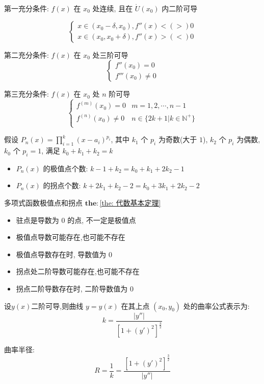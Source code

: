 \begin{theorem}[拐点判别]
	第一充分条件: $f(x)$ 在 $x_{0}$ 处连续, 且在 $\mathring{U}(x_{0})$ 内二阶可导
	
	$$\begin{cases}
		x\in(x_{0}-\delta,x_{0}), f''(x)<(>)0\\
		x\in(x_{0},x_{0}+\delta), f''(x)>(<)0
	\end{cases}$$

	第二充分条件: $f(x)$ 在 $x_{0}$ 处三阶可导
	$$\begin{cases}
		f''(x_{0}) = 0\\
		f'''(x_{0})\neq 0
	\end{cases}$$

	第三充分条件: $f(x)$ 在 $x_{0}$ 处 $n$ 阶可导
	$$\begin{cases}
		f^{(m)}(x_{0}) = 0 & m = 1,2,\cdots,n-1\\
		f^{(n)}(x_{0}) \neq 0 & n\in \{2k+1|k\in \mathbb{N}^{+}\}\\
	\end{cases}$$
	
\end{theorem}
\begin{theorem}[多项式函数极值点和拐点个数]
	假设 $P_{n}(x)=\prod\limits_{i=1}^{k}(x-a_{i})^{p_{i}}$, 
	其中 $k_{1}$ 个 $p_{i}$ 为奇数(大于 $1$), $k_{2}$ 个 $p_{i}$ 为偶数, $k_{0}$ 个 $p_{i}=1$, 满足 $k_{0}+k_{1}+k_{2} = k$
	
	\begin{itemize}
		\item $P_{n}(x)$ 的极值点个数: $k-1+k_{2} = k_{0}+k_{1}+2k_{2}-1$
		\item $P_{n}(x)$ 的拐点个数: $k+2k_{1}+k_{2}-2 = k_{0}+3k_{1}+2k_{2}-2$
	\end{itemize}
	多项式函数极值点和拐点 $\mathbf{the: }$\ref{the: 代数基本定理}
\end{theorem}
\begin{anymark}[注]
	\begin{itemize}
		\item 驻点是导数为 $0$ 的点, 不一定是极值点
		\item 极值点导数可能存在,也可能不存在
		\item 极值点导数存在时, 导数值为 $0$
		\item 拐点处二阶导数可能存在,也可能不存在
		\item 拐点二阶导数存在时, 二阶导数值为 $0$
	\end{itemize}
\end{anymark}
\begin{definition}[曲率和曲率半径]

	设$y(x)$二阶可导,则曲线 $y=y(x)$ 在其上点 $(x_{0},y_{0})$ 处的曲率公式表示为:
	$$k=\frac{|y''|}{[1+(y')^{2}]^{\frac{3}{2}}}$$

	曲率半径:
	$$R=\frac{1}{k}=\frac{[1+(y')^{2}]^{\frac{3}{2}}}{|y''|}$$
\end{definition}
